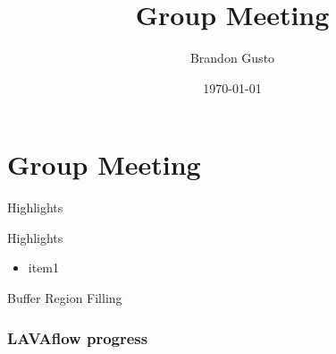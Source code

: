 \documentclass{beamer}
\begin{document}
  \section{Group Meeting}
  \title{Group Meeting}
  \author{Brandon Gusto}

  \date{\today}
  \frame{\titlepage}

  \begin{frame}{Highlights}
    \begin{block}{Highlights}
      \begin{itemize}
        \setlength\itemsep{1em}
        \item item1
      \end{itemize}
    \end{block}
  \end{frame}

  \begin{frame}{Buffer Region Filling}
    \begin{figure}
      
    \end{figure}
  \end{frame}

  \begin{frame}
      \frametitle{LAVAflow progress}
  \end{frame}
\end{document}

